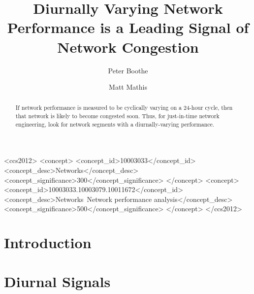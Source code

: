 \documentclass[sigconf]{acmart}
\begin{document}
\title{Diurnally Varying Network Performance is a Leading Signal of Network Congestion}


\author{Peter Boothe}

\author{Matt Mathis}

\begin{abstract}
If network performance is measured to be cyclically varying on a 24-hour cycle,
then that network is likely to become congested soon. Thus, for
just-in-time network engineering, look for network segments with a
diurnally-varying performance.
\end{abstract}

%
%
\begin{CCSXML}
<ccs2012>
 <concept>
  <concept_id>10003033</concept_id>
  <concept_desc>Networks</concept_desc>
  <concept_significance>300</concept_significance>
 </concept>
 <concept>
  <concept_id>10003033.10003079.10011672</concept_id>
  <concept_desc>Networks~Network performance analysis</concept_desc>
  <concept_significance>500</concept_significance>
 </concept>
</ccs2012>  
\end{CCSXML}




\maketitle

\section{Introduction}

\section{Diurnal Signals}
\end{document}
